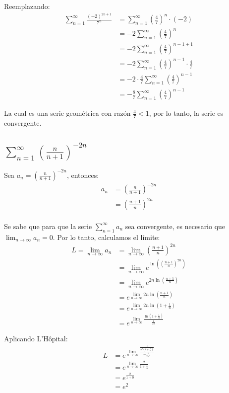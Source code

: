 \documentclass{article}
\begin{document}
Reemplazando:
\begin{align*}
\sum_{n=1}^{\infty} \frac{(-2)^{2n+1}}{7^n} &= \sum_{n=1}^{\infty} \left(\frac{4}{7}\right)^n \cdot (-2) \\
&= -2 \sum_{n=1}^{\infty} \left(\frac{4}{7}\right)^n \\
&= -2 \sum_{n=1}^{\infty} \left(\frac{4}{7}\right)^{n-1+1} \\
&= -2 \sum_{n=1}^{\infty} \left(\frac{4}{7}\right)^{n-1} \cdot \frac{4}{7} \\
&= -2 \cdot \frac{4}{7} \sum_{n=1}^{\infty} \left(\frac{4}{7}\right)^{n-1} \\
&= -\frac{8}{7} \sum_{n=1}^{\infty} \left(\frac{4}{7}\right)^{n-1}
\end{align*}

La cual es una serie geométrica con razón $\frac{4}{7} < 1$, por lo tanto, la serie es convergente.

\subsection{$\sum_{n=1}^{\infty} (\frac{n}{n+1})^{-2n}$}

Sea $a_n = (\frac{n}{n+1})^{-2n}$, entonces:
\begin{align*}
a_n &= \left(\frac{n}{n+1}\right)^{-2n} \\
&= \left(\frac{n+1}{n}\right)^{2n} \\
\end{align*}

Se sabe que para que la serie $\sum_{n=1}^{\infty} a_n$ sea convergente, es necesario que $\lim_{n \to \infty} a_n = 0$. Por lo tanto, calculamos el límite:
\begin{align*}
L = \lim_{n \to \infty} a_n &= \lim_{n \to \infty} \left(\frac{n+1}{n}\right)^{2n} \\
&= \lim_{n \to \infty} e^{\ln(\left(\frac{n+1}{n}\right)^{2n})} \\
&= \lim_{n \to \infty} e^{2n \ln(\frac{n+1}{n})} \\
&= e^{\lim_{n \to \infty} 2n \ln(\frac{n+1}{n})} \\
&= e^{\lim_{n \to \infty} 2n \ln(1 + \frac{1}{n})} \\
&= e^{\lim_{n \to \infty} \frac{\ln(1 + \frac{1}{n})}{\frac{1}{2n}}} 
\end{align*}

Aplicando L'Hôpital:
\begin{align*}
L &= e^{\lim_{n \to \infty} \frac{\frac{-1}{n^2(1 + \frac{1}{n})}}{-\frac{1}{2n^2}}} \\
&= e^{\lim_{n \to \infty} \frac{2}{1 + \frac{1}{n}}} \\
&= e^{\frac{2}{1 + 0}} \\
&= e^2
\end{align*}
\end{document}
